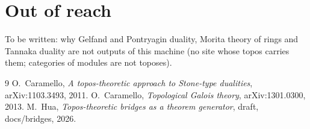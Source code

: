 \documentclass[11pt]{article}
\begin{document}
\section{Out of reach}\label{sec:limits}
To be written: why Gelfand and Pontryagin duality, Morita theory of rings and Tannaka duality are
not outputs of this machine (no site whose topos carries them; categories of modules are not
toposes).

\begin{thebibliography}{9}
 O.~Caramello, \emph{A topos-theoretic approach to Stone-type dualities},
arXiv:1103.3493, 2011.
 O.~Caramello, \emph{Topological Galois theory}, arXiv:1301.0300, 2013.
 M.~Hua, \emph{Topos-theoretic bridges as a theorem generator},
draft, docs/bridges, 2026.
\end{thebibliography}
\end{document}
